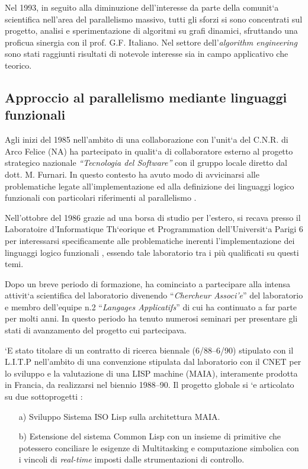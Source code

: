\documentclass[11pt]{article}
\begin{document}
Nel 1993, in seguito alla diminuzione dell'interesse da parte
della  comunit\a`a scientifica nell'area del parallelismo massivo,
tutti gli  sforzi si sono concentrati sul progetto, analisi e
sperimentazione  di algoritmi su grafi dinamici, sfruttando una
proficua sinergia con il prof. G.F. Italiano.
Nel settore dell'{\sl algorithm engineering} sono stati
raggiunti risultati  di notevole interesse sia in campo applicativo
che  teorico.


\subsection{Approccio al parallelismo mediante linguaggi funzionali} 

Agli inizi del 1985 nell'ambito di una
collaborazione con l'unit\a`a del C.N.R. di Arco Felice (NA) 
ha partecipato in qualit\a`a di collaboratore esterno al
progetto strategico nazionale {\sl ``Tecnologia del Software''} con il gruppo
locale diretto dal dott. M. Furnari. In questo contesto 
ha avuto modo di avvicinarsi alle problematiche legate
all'implementazione ed alla definizione dei linguaggi logico
funzionali \cite{icon:2,mxlog:1} con particolari riferimenti al parallelismo
\cite{cnr:1,cnr:2}.

\label{parigi} 
Nell'ottobre del 1986 grazie ad una
borsa di studio per l'estero, si recava presso il Laboratoire
d'Informatique Th\a`eorique et Programmation dell'Universit\a`a Parigi 6
per interessarsi specificamente alle problematiche inerenti
l'implementazione dei linguaggi logico funzionali \cite{litp:1},
essendo tale laboratorio tra i pi\`u qualificati su questi temi.

Dopo un breve periodo di formazione, ha cominciato a partecipare alla
intensa attivit\a`a scientifica del laboratorio divenendo
``{\sl Chercheur Associ\a'e}'' del laboratorio e membro dell'equipe n.2
``{\sl Langages Applicatifs}'' di cui ha continuato  a far parte per
molti anni.
In questo periodo ha tenuto numerosi seminari per presentare gli stati
di avanzamento del progetto cui partecipava.

\a`E stato titolare di un contratto di
ricerca biennale (6/88--6/90) stipulato con il L.I.T.P
nell'ambito di una convenzione stipulata dal laboratorio con il
CNET per lo sviluppo e la valutazione di una LISP machine (MAIA),
interamente prodotta in Francia, da realizzarsi nel biennio 1988--90.
Il progetto globale si \a`e articolato su due sottoprogetti :

\begin{enumerate}
\item [a)] Sviluppo Sistema ISO Lisp sulla architettura MAIA.
\item [b)] Estensione del sistema Common Lisp con un insieme di
  primitive che potessero conciliare le esigenze di Multitasking e
  computazione simbolica con i vincoli di {\sl real-time} imposti
  dalle strumentazioni di controllo.
\end{enumerate}
\end{document}
